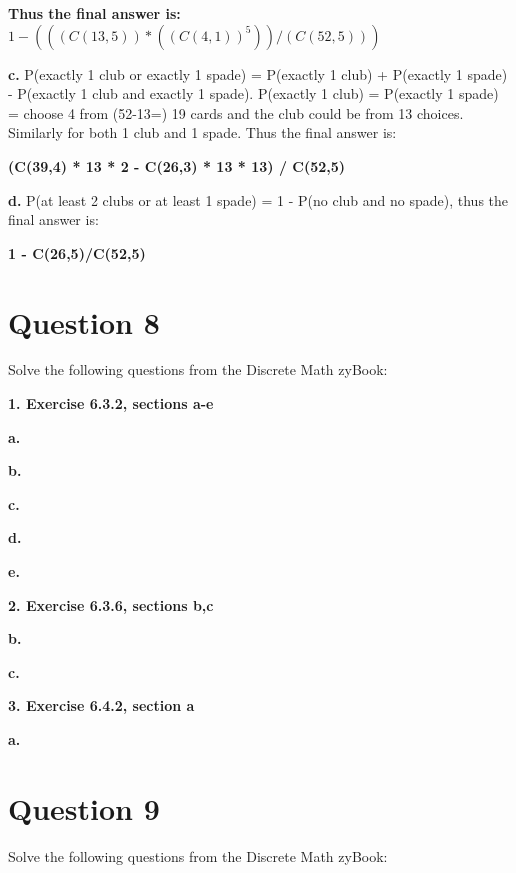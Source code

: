 \documentclass[11pt]{article}
\begin{document}
	\textbf{Thus the final answer is:}
	$1-(((C(13,5))*((C(4,1))^5))/(C(52,5)))$
	
	\vspace{10mm}
	\textbf{c.}
	P(exactly 1 club or exactly 1 spade) = P(exactly 1 club) + P(exactly 1 spade) - P(exactly 1 club and exactly 1 spade). P(exactly 1 club) = P(exactly 1 spade) = choose 4 from (52-13=) 19 cards and the club could be from 13 choices. Similarly for both 1 club and 1 spade. Thus the final answer is:
	
	\textbf{(C(39,4) * 13 * 2 - C(26,3) * 13 * 13) / C(52,5)}

	
	\vspace{10mm}
	\textbf{d.}
	P(at least 2 clubs or at least 1 spade) = 1 - P(no club and no spade), thus the final answer is:
	
	\textbf{1 - C(26,5)/C(52,5)}
	
	\newpage
	\section*{Question 8}
	Solve the following questions from the Discrete Math zyBook:
	
	\textbf{1. Exercise 6.3.2, sections a-e}
	
	\textbf{a.}
	
	
	\vspace{10mm}
	\textbf{b.}
	

	
	\vspace{10mm}
	\textbf{c.}
	
	
	
	\vspace{10mm}
	\textbf{d.}

	
	\vspace{10mm}
	\textbf{e.}
	
	
	
	\vspace{10mm}
	\textbf{2. Exercise 6.3.6, sections b,c}
	
	\textbf{b.}
	
	
	\vspace{10mm}
	\textbf{c.}
	
	\vspace{10mm}
	\textbf{3. Exercise 6.4.2, section a}
	
	\textbf{a.}

	\newpage
	\section*{Question 9}
	Solve the following questions from the Discrete Math zyBook:
	
\end{document}
